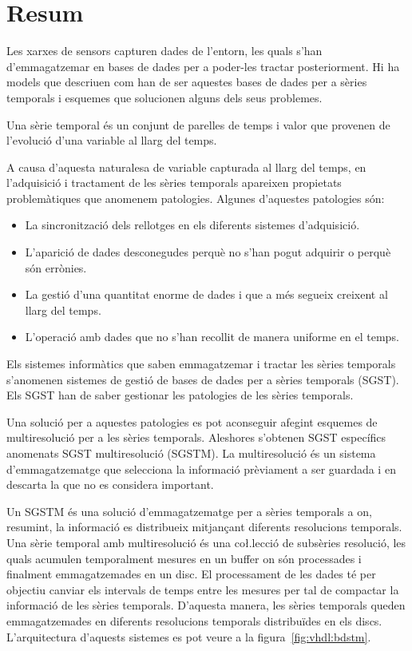 \chapter*{Resum}


Les xarxes de sensors capturen dades de l'entorn, les quals s'han
d'emmagatzemar en bases de dades per a poder-les tractar
posteriorment. Hi ha models que descriuen com han de ser aquestes
bases de dades per a sèries temporals i esquemes que solucionen alguns
dels seus problemes. 


Una sèrie temporal és un conjunt de parelles de temps i valor que
provenen de l'evolució d'una variable al llarg del temps. 

A causa d'aquesta naturalesa de variable capturada al llarg del temps,
en l'adquisició i tractament de les sèries temporals apareixen
propietats problemàtiques que anomenem patologies.
Algunes d'aquestes patologies són:
\begin{itemize}
\item La sincronització dels rellotges en els diferents sistemes
  d'adquisició.
\item L'aparició de dades desconegudes perquè no s'han pogut adquirir
  o perquè són errònies.
\item La gestió d'una quantitat enorme de dades i que a més segueix
  creixent al llarg del temps.
\item L'operació amb dades que no s'han recollit de manera uniforme en
  el temps.
\end{itemize}


Els sistemes informàtics que saben emmagatzemar i tractar les sèries
temporals s'anomenen sistemes de gestió de bases de dades per a sèries
temporals (SGST). Els SGST han de saber gestionar les patologies de
les sèries temporals. 

Una solució per a aquestes patologies es pot aconseguir afegint
esquemes de multiresolució per a les sèries temporals. Aleshores
s'obtenen SGST específics anomenats SGST multiresolució (SGSTM).  La
multiresolució és un sistema d'emmagatzematge que selecciona la
informació prèviament a ser guardada i en descarta la que no es
considera important.




Un SGSTM és una solució d'emmagatzematge per a sèries temporals a on,
resumint, la informació es distribueix mitjançant diferents
resolucions temporals.  Una sèrie temporal amb multiresolució és una
co\l.lecció de subsèries resolució, les quals acumulen temporalment
mesures en un buffer on són processades i finalment emmagatzemades
en un disc. El processament de les dades té per objectiu canviar els
intervals de temps entre les mesures per tal de compactar la
informació de les sèries temporals. D'aquesta manera, les sèries
temporals queden emmagatzemades en diferents resolucions temporals
distribuïdes en els discs.  L'arquitectura d'aquests sistemes es pot
veure a la figura~\ref{fig:vhdl:bdstm}.

